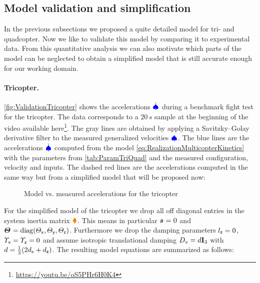 \clearpage
\subsection{Model validation and simplification}
In the previous subsections we proposed a quite detailed model for tri- and quadcopter.
Now we like to validate this model by comparing it to experimental data.
From this quantitative analysis we can also motivate which parts of the model can be neglected to obtain a simplified model that is still accurate enough for our working domain.

\paragraph*{Tricopter.}
\autoref{fig:ValidationTricopter} shows the accelerations $\sysVeld$ during a benchmark fight test for the tricopter.
The data corresponds to a $20\,\unit{s}$ sample at the beginning of the video available here\footnote{\url{https://youtu.be/oS5PHr6H0K4}}.
The gray lines are obtained by applying a Savitzky–Golay derivative filter to the measured generalized velocities $\sysVel$.
The blue lines are the accelerations $\sysVeld$ computed from the model \eqref{eq:RealizationMulticopterKinetics} with the parameters from \autoref{tab:ParamTriQuad} and the measured configuration, velocity and inputs.
The dashed red lines are the accelerations computed in the same way but from a simplified model that will be proposed now:

\begin{figure}[p]
 \centering
 \footnotesize%
 
 \vspace{-20pt}
 \caption{Model vs. measured accelerations for the tricopter}
 \label{fig:ValidationTricopter}
\end{figure}

For the simplified model of the tricopter we drop all off diagonal entries in the system inertia matrix $\sysInertiaMat$.
This means in particular $\bodyCOM{}{}{} = 0$ and $\bodyMOI{}{}{} = \diag(\Jx, \Jy, \Jz)$.
Furthermore we drop the damping parameters $\lz=0$, $\sigx=\sigz=0$ and assume isotropic translational damping $D_v = \DampingSym \idMat[3]$ with $\DampingSym = \tfrac{1}{3}(2\dvx + \dvz)$.
The resulting model equations are summarized as follows:

